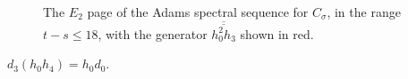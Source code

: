\documentclass{MetricNotes2023}
\def\bb{\ensuremath\mathbb}
\begin{document}


\begin{figure}[H]\label{2504131812}
\centering

\caption{The \(E_2\) page of the Adams spectral sequence for \(C_\sigma\), in the range \(t-s\leq 18\), with the generator \(\overline{\overline{h_0^2h_3}}\) shown in red.}
\end{figure}

\begin{theorem}
\(d_3(h_0h_4)=h_0d_0\).
\end{theorem}
\end{document}
